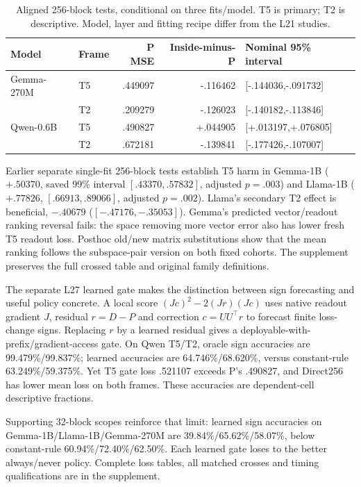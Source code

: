 \documentclass[11pt]{article}
\begin{document}
\begin{table}[ht]\centering\small
\begin{tabular}{llrrl}\toprule Model & Frame & P MSE & Inside-minus-P & Nominal 95\% interval\\\midrule
Gemma-270M & T5 & .449097 & -.116462 & [-.144036,-.091732]\\
 & T2 & .209279 & -.126023 & [-.140182,-.113846]\\
Qwen-0.6B & T5 & .490827 & +.044905 & [+.013197,+.076805]\\
 & T2 & .672181 & -.139841 & [-.177426,-.107007]\\\bottomrule\end{tabular}
\caption{Aligned 256-block tests, conditional on three fits/model. T5 is primary; T2 is descriptive. Model, layer and fitting recipe differ from the L21 studies.}\label{tab:aligned}
\end{table}

Earlier separate single-fit 256-block tests establish T5 harm in Gemma-1B ($+.50370$, saved 99\% interval $[.43370,.57832]$, adjusted $p=.003$) and Llama-1B ($+.77826$, $[.66913,.89066]$, adjusted $p=.002$). Llama's secondary T2 effect is beneficial, $-.40679$ ($[-.47176,-.35053]$). Gemma's predicted vector/readout ranking reversal fails: the space removing more vector error also has lower fresh T5 readout loss. Posthoc old/new matrix substitutions show that the mean ranking follows the subspace-pair version on both fixed cohorts. The supplement preserves the full crossed table and original family definitions.

The separate L27 learned gate makes the distinction between sign forecasting and useful policy concrete. A local score $(Jc)^2-2(Jr)(Jc)$ uses native readout gradient $J$, residual $r=D-P$ and correction $c=UU^\top r$ to forecast finite loss-change signs. Replacing $r$ by a learned residual gives a deployable-with-prefix/gradient-access gate. On Qwen T5/T2, oracle sign accuracies are 99.479\%/99.837\%; learned accuracies are 64.746\%/68.620\%, versus constant-rule 63.249\%/59.375\%. Yet T5 gate loss .521107 exceeds P's .490827, and Direct256 has lower mean loss on both frames. These accuracies are dependent-cell descriptive fractions.

Supporting 32-block scopes reinforce that limit: learned sign accuracies on Gemma-1B/Llama-1B/Gemma-270M are 39.84\%/65.62\%/58.07\%, below constant-rule 60.94\%/72.40\%/62.50\%. Each learned gate loses to the better always/never policy. Complete loss tables, all matched crosses and timing qualifications are in the supplement.
\end{document}
